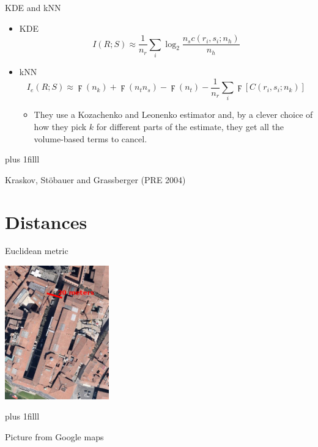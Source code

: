 \documentclass{beamer}
\newcommand{\btVFill}{\vskip0pt plus 1filll}
\begin{document}
\begin{frame}{KDE and kNN}
\color{black}
\begin{itemize}
\item KDE
\color{dark}
$$
 I(R;S) \approx \frac{1}{n_r}\sum_{i} \log_2{\frac{n_sc(r_i,s_i;n_h)}{n_h}}
$$
\color{black}
\item kNN
\color{dark}
$$
   I_e(R;S) \approx  \digamma(n_k) + \digamma(n_tn_s)-\digamma(n_t) - \displaystyle \frac{1}{n_r} \sum_{i} \digamma[C(r_i,s_i;n_k)] 
$$
\color{black}
\begin{itemize}
\item They use a Kozachenko and Leonenko estimator and, by a clever choice of how they pick $k$ for different parts of the estimate, they get all the volume-based terms to cancel.
\end{itemize} 
\end{itemize}
\btVFill
\begin{flushright}
\tiny{Kraskov, St\"{o}bauer and Grassberger (PRE 2004)}
\end{flushright}
\end{frame}

\section{Distances}

\begin{frame}{Euclidean metric}
\begin{center}
\includegraphics[width=4.5cm]{U1.png}
\end{center}
\btVFill
\begin{flushright}
\tiny{Picture from Google maps}
\end{flushright}
\end{frame}
\end{document}
